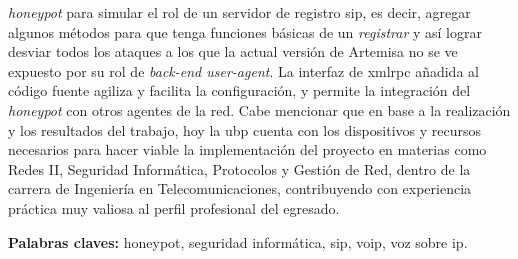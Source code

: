 \documentclass[a4paper,12pt]{report}
\begin{document}
\emph{honeypot} para simular el rol de un servidor de registro \ac{sip}, es decir, agregar algunos
métodos para que tenga funciones básicas de un \emph{registrar} y así lograr desviar todos los ataques
a los que la actual versión de Artemisa no se ve expuesto por su rol de \emph{back-end user-agent}.
La interfaz de \ac{xmlrpc} añadida al código fuente agiliza y facilita la
configuración, y permite la integración del \emph{honeypot} con otros agentes de la
red. 
Cabe mencionar que en base a la realización y los resultados del trabajo,
hoy la \ac{ubp} cuenta con los dispositivos y recursos necesarios para hacer viable la implementación
del proyecto en materias como Redes II, Seguridad Informática, Protocolos y Gestión de Red, 
dentro de la carrera de Ingeniería
en Telecomunicaciones, contribuyendo con experiencia práctica muy valiosa al perfil profesional del egresado.

\begin{flushleft}
\textbf{Palabras claves:} honeypot, seguridad informática, \ac{sip}, \ac{voip}, voz sobre ip.
\end{flushleft}
\end{document}

